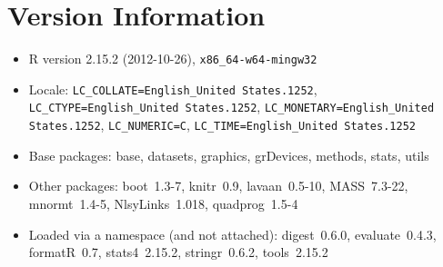 \documentclass[letterpaper]{article}\usepackage{graphicx, color}
\begin{document}
\section{Version Information}
\begin{itemize}\raggedright
  \item R version 2.15.2 (2012-10-26), \verb|x86_64-w64-mingw32|
  \item Locale: \verb|LC_COLLATE=English_United States.1252|, \verb|LC_CTYPE=English_United States.1252|, \verb|LC_MONETARY=English_United States.1252|, \verb|LC_NUMERIC=C|, \verb|LC_TIME=English_United States.1252|
  \item Base packages: base, datasets, graphics, grDevices, methods, stats,
    utils
  \item Other packages: boot~1.3-7, knitr~0.9, lavaan~0.5-10, MASS~7.3-22,
    mnormt~1.4-5, NlsyLinks~1.018, quadprog~1.5-4
  \item Loaded via a namespace (and not attached): digest~0.6.0,
    evaluate~0.4.3, formatR~0.7, stats4~2.15.2, stringr~0.6.2, tools~2.15.2
\end{itemize}



\end{document}
